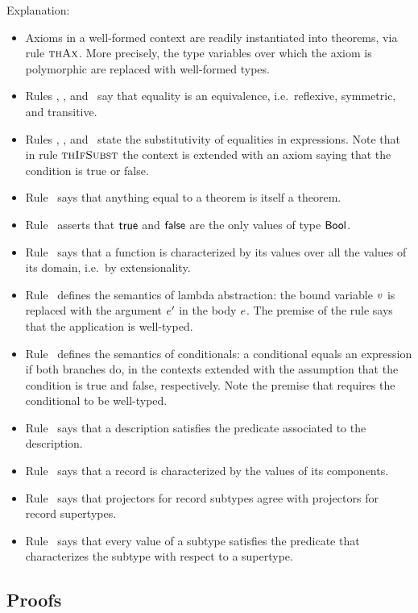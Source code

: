Explanation:
\begin{itemize}
\item
Axioms in a well-formed context are readily instantiated into theorems, via
rule $\textsc{thAx}$. More precisely, the type variables over which the axiom is
polymorphic are replaced with well-formed types.
\item
Rules \Rthrefl, \Rthsymm, and \Rthtrans\ say that equality is an
equivalence, i.e.\ reflexive, symmetric, and transitive.
\item
Rules \Rthappsbs, \Rtheqsbs, and \Rthifsbs\ state the substitutivity of
equalities in expressions. Note that in rule $\textsc{thIfSubst}$ the context is
extended with an axiom saying that the condition is true or false.
\item
Rule \Rthsbs\ says that anything equal to a theorem is itself a theorem.
\item
Rule \Rthbool\ asserts that $\mathsf{true}$ and $\mathsf{false}$ are the only values of type
$\mathsf{Bool}$.
\item
Rule \Rthext\ says that a function is characterized by its values over all
the values of its domain, i.e.\ by extensionality.
\item
Rule \Rthabs\ defines the semantics of lambda abstraction: the bound variable
$v$ is replaced with the argument $e'$ in the body $e$. The premise
of the rule says that the application is well-typed.
\item
Rule \Rthif\ defines the semantics of conditionals: a conditional equals an
expression if both branches do, in the contexts extended with the assumption
that the condition is true and false, respectively. Note the premise that
requires the conditional to be well-typed.
\item
Rule \Rthdesc\ says that a description satisfies the predicate associated to
the description.
\item
Rule \Rthrec\ says that a record is characterized by the values of its
components.
\item
Rule \Rthprojsub\ says that projectors for record subtypes agree with
projectors for record supertypes.
\item
Rule \Rthsub\ says that every value of a subtype satisfies the predicate that
characterizes the subtype with respect to a supertype.
\end{itemize}

\subsection{Proofs}

